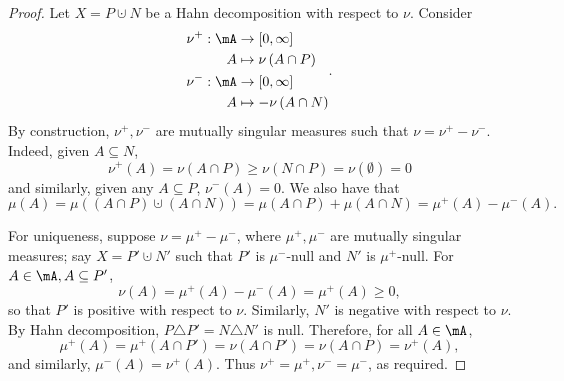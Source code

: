 \documentclass[pmath451]{subfiles}
\begin{document}
    \begin{proof}
        Let $X = P\cupdot N$ be a Hahn decomposition with respect to $\nu$. Consider
        \begin{equation*}
            \begin{aligned}
                \nu^+:\mA&\to\left[ 0,\infty \right] \\
                A&\mapsto\nu\left( A\cap P \right) \\
                \nu^-:\mA&\to\left[ 0,\infty \right] \\
                A&\mapsto-\nu\left( A\cap N \right)
            \end{aligned} .
        \end{equation*}
        By construction, $\nu^+,\nu^-$ are mutually singular measures such that $\nu=\nu^+-\nu^-$. Indeed, given $A\subseteq N$,
        \begin{equation*}
            \nu^+\left( A \right) = \nu\left( A\cap P \right) \geq \nu\left( N\cap P \right) = \nu\left( \emptyset \right) = 0
        \end{equation*}
        and similarly, given any $A\subseteq P$, $\nu^-\left( A \right) = 0$. We also have that
        \begin{equation*}
            \mu\left( A \right) = \mu\left( \left( A\cap P \right)\cupdot\left( A\cap N \right) \right) = \mu\left( A\cap P \right) + \mu\left( A\cap N \right) = \mu^+\left( A \right) - \mu^-\left( A \right).
        \end{equation*}

        For uniqueness, suppose $\nu=\mu^+-\mu^-$, where $\mu^+,\mu^-$ are mutually singular measures; say $X = P'\cupdot N'$ such that $P'$ is $\mu^-$-null and $N'$ is $\mu^+$-null. For $A\in\mA, A\subseteq P'$,
        \begin{equation*}
            \nu\left( A \right) = \mu^+\left( A \right) - \mu^-\left( A \right) = \mu^+\left( A \right) \geq 0,
        \end{equation*}
        so that $P'$ is positive with respect to $\nu$. Similarly, $N'$ is negative with respect to $\nu$. By Hahn decomposition, $P\triangle P' = N\triangle N'$ is null. Therefore, for all $A\in\mA$,
        \begin{equation*}
            \mu^+\left( A \right) = \mu^+\left( A\cap P' \right) = \nu\left( A\cap P' \right) = \nu\left( A\cap P \right) = \nu^+\left( A \right),
        \end{equation*}
        and similarly, $\mu^-\left( A \right) = \nu^+\left( A \right)$. Thus $\nu^+=\mu^+, \nu^-=\mu^-$, as required.
    \end{proof}
   
\end{document}
